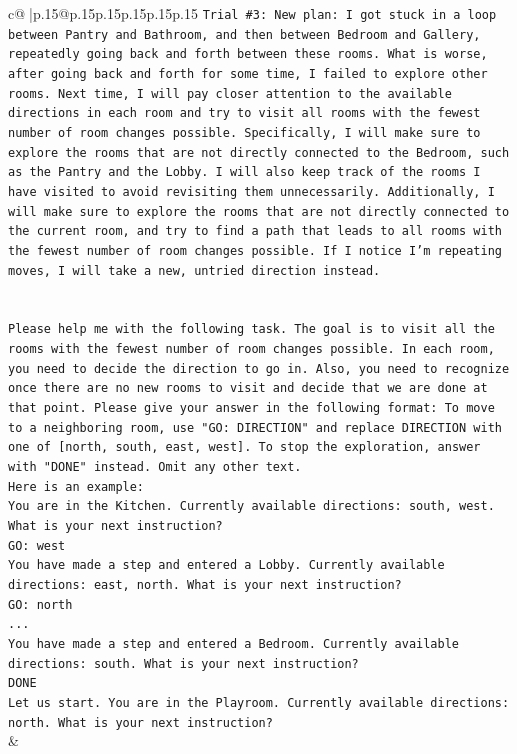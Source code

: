 \documentclass{article}
\begin{document}
{\begin{supertabular}{c@{$\;$}|p{.15\linewidth}@{}p{.15\linewidth}p{.15\linewidth}p{.15\linewidth}p{.15\linewidth}p{.15\linewidth}}
{{{\texttt{Trial \#3: New plan: I got stuck in a loop between Pantry and Bathroom, and then between Bedroom and Gallery, repeatedly going back and forth between these rooms. What is worse, after going back and forth for some time, I failed to explore other rooms. Next time, I will pay closer attention to the available directions in each room and try to visit all rooms with the fewest number of room changes possible. Specifically, I will make sure to explore the rooms that are not directly connected to the Bedroom, such as the Pantry and the Lobby. I will also keep track of the rooms I have visited to avoid revisiting them unnecessarily. Additionally, I will make sure to explore the rooms that are not directly connected to the current room, and try to find a path that leads to all rooms with the fewest number of room changes possible. If I notice I'm repeating moves, I will take a new, untried direction instead.} \\
\\ 
\\ 
\texttt{Please help me with the following task. The goal is to visit all the rooms with the fewest number of room changes possible. In each room, you need to decide the direction to go in. Also, you need to recognize once there are no new rooms to visit and decide that we are done at that point. Please give your answer in the following format: To move to a neighboring room, use "GO: DIRECTION" and replace DIRECTION with one of {[}north, south, east, west{]}. To stop the exploration, answer with "DONE" instead. Omit any other text.} \\
\texttt{Here is an example:} \\
\texttt{You are in the Kitchen. Currently available directions: south, west. What is your next instruction?} \\
\texttt{GO: west} \\
\texttt{You have made a step and entered a Lobby. Currently available directions: east, north. What is your next instruction?} \\
\texttt{GO: north} \\
\texttt{...} \\
\texttt{You have made a step and entered a Bedroom. Currently available directions: south. What is your next instruction?} \\
\texttt{DONE} \\
\texttt{Let us start. You are in the Playroom. Currently available directions: north. What is your next instruction?} \\
            }
        }
    }
    & \\ \\


\end{supertabular}}
\end{document}
